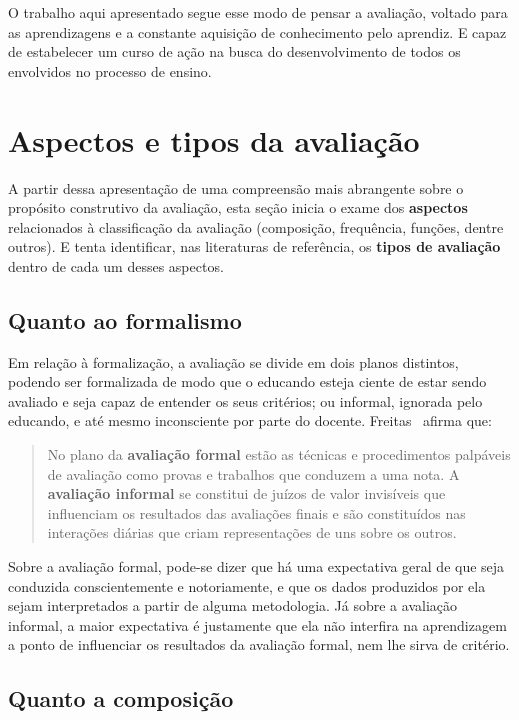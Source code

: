 O trabalho aqui apresentado segue esse modo de pensar a avaliação, voltado para as aprendizagens e a constante aquisição de conhecimento pelo aprendiz. E capaz de estabelecer um curso de ação na busca do desenvolvimento de todos os envolvidos no processo de ensino.

\section{Aspectos e tipos da avaliação}%

A partir dessa apresentação de uma compreensão mais abrangente sobre o propósito construtivo da avaliação, esta seção inicia o exame dos \textbf{aspectos} relacionados à classificação da avaliação (composição, frequência, funções, dentre outros). E tenta identificar, nas literaturas de referência, os \textbf{tipos de avaliação} dentro de cada um desses aspectos.

\subsection{Quanto ao formalismo}%
Em relação à formalização, a  avaliação se divide em dois planos distintos, podendo ser formalizada de modo que o educando esteja ciente de estar sendo avaliado e seja capaz de entender os seus critérios; ou informal, ignorada pelo educando, e até mesmo inconsciente por parte do docente. Freitas~\cite{de2003ciclos} afirma que:

\begin{quote}
No plano da \textbf{avaliação formal} estão as técnicas e procedimentos palpáveis de avaliação como provas e trabalhos que conduzem a uma nota. A \textbf{avaliação informal} se constitui de juízos de valor invisíveis que influenciam os resultados das avaliações finais e são constituídos nas interações diárias que criam representações de uns sobre os outros.~\cite{de2003ciclos} 
\end{quote}%

Sobre a avaliação formal, pode-se dizer que há uma expectativa geral de que seja conduzida conscientemente e notoriamente, e que os dados produzidos por ela sejam interpretados a partir de alguma metodologia. Já sobre a avaliação informal, a maior expectativa é justamente que ela não interfira na aprendizagem a ponto de influenciar os resultados da avaliação formal, nem lhe sirva de critério.

\subsection{Quanto a composição}%

